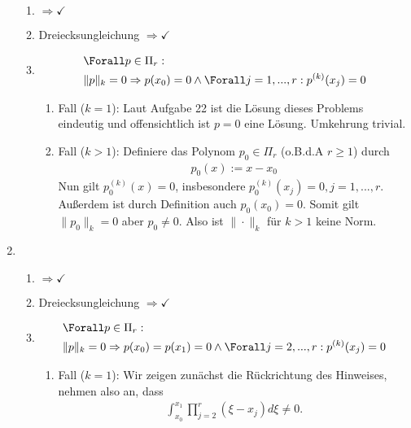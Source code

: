 \begin{solution}
\begin{enumerate}[label = \textbf{\alph*)}]
  \begin{enumerate}[label = \textit{\roman*)}]
    \item {} $\Rightarrow \checkmark$
    \item Dreiecksungleichung $\Rightarrow \checkmark$
    \item {} \begin{align*}
      &\Forall p \in \Pi_r: \\
      & \|p\|_k = 0 \Rightarrow p(x_0) = 0 \land \Forall j=1,...,r: p^{(k)}(x_j) = 0
    \end{align*}
    \begin{enumerate}[label = \textit{\arabic*.}]
      \item Fall ($k=1$):
      Laut Aufgabe 22 ist die Lösung dieses Problems eindeutig und offensichtlich ist $p = 0$ eine Lösung.
      Umkehrung trivial.
      \item Fall ($k>1$):
      Definiere das Polynom $p_0 \in \Pi_r$ (o.B.d.A $r \geq 1$) durch
      \begin{align*}
        p_0(x) := x-x_0
      \end{align*}
      Nun gilt $p_0^{(k)}(x) = 0$, insbesondere $p_0^{(k)}(x_j) = 0, j=1,...,r$. Außerdem ist durch Definition auch $p_0(x_0) = 0$.
      Somit gilt $\|p_0\|_k = 0$ aber $p_0 \neq 0$. Also ist $\|\cdot\|_k$ für $k>1$ keine Norm.
    \end{enumerate}
  \end{enumerate}
  \item
  \begin{enumerate}[label = \textit{\roman*)}]
    \item {} $\Rightarrow \checkmark$
    \item Dreiecksungleichung $\Rightarrow \checkmark$
    \item {} \begin{align*}
      &\Forall p \in \Pi_r: \\
      & \|p\|_k = 0 \Rightarrow p(x_0) = p(x_1) = 0 \land \Forall j=2,...,r: p^{(k)}(x_j) = 0
    \end{align*}
    \begin{enumerate}[label = \textit{\arabic*.}]
      \item Fall ($k=1$):
      Wir zeigen zunächst die Rückrichtung des Hinweises, nehmen also an, dass
      \begin{align*}
        \int_{x_0}^{x_1} \prod_{j=2}^r \left(\xi - x_j\right)d\xi \neq 0.
      \end{align*}

\end{enumerate}
\end{enumerate}
\end{enumerate}
\end{solution}
